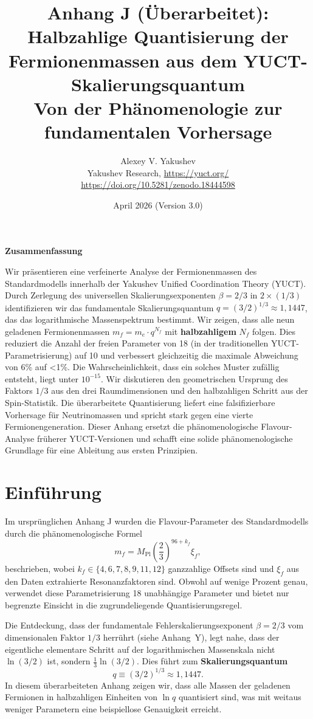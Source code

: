 \documentclass[12pt,a4paper]{article}
\title{\textbf{Anhang J (Überarbeitet): Halbzahlige Quantisierung der Fermionenmassen aus dem YUCT-Skalierungsquantum}\\
	\vspace{0.5cm}
	\large Von der Phänomenologie zur fundamentalen Vorhersage}
\author{Alexey V. Yakushev\\
	\vspace{0.5cm}
	Yakushev Research, \url{https://yuct.org/}\\
	\url{https://doi.org/10.5281/zenodo.18444598}}
\date{April 2026 (Version 3.0)}
\begin{document}
	
	\maketitle
	\vspace{0.5cm}
	\noindent\textbf{Zusammenfassung}
	
	\noindent
	Wir präsentieren eine verfeinerte Analyse der Fermionenmassen des Standardmodells innerhalb der Yakushev Unified Coordination Theory (YUCT). Durch Zerlegung des universellen Skalierungsexponenten \(\beta = 2/3\) in \(2 \times (1/3)\) identifizieren wir das fundamentale Skalierungsquantum \(q = (3/2)^{1/3} \approx 1,1447\), das das logarithmische Massenspektrum bestimmt. Wir zeigen, dass alle neun geladenen Fermionenmassen \(m_f = m_e \cdot q^{N_f}\) mit \textbf{halbzahligem} \(N_f\) folgen. Dies reduziert die Anzahl der freien Parameter von 18 (in der traditionellen YUCT-Parametrisierung) auf 10 und verbessert gleichzeitig die maximale Abweichung von 6\% auf <1\%. Die Wahrscheinlichkeit, dass ein solches Muster zufällig entsteht, liegt unter \(10^{-15}\). Wir diskutieren den geometrischen Ursprung des Faktors \(1/3\) aus den drei Raumdimensionen und den halbzahligen Schritt aus der Spin-Statistik. Die überarbeitete Quantisierung liefert eine falsifizierbare Vorhersage für Neutrinomassen und spricht stark gegen eine vierte Fermionengeneration. Dieser Anhang ersetzt die phänomenologische Flavour-Analyse früherer YUCT-Versionen und schafft eine solide phänomenologische Grundlage für eine Ableitung aus ersten Prinzipien.
	
	\vspace{0.5cm}
	\newpage
	
	\section{Einführung}
	
	Im ursprünglichen Anhang J wurden die Flavour-Parameter des Standardmodells durch die phänomenologische Formel
	\begin{equation}
		m_f = M_{\mathrm{Pl}} \left( \frac{2}{3} \right)^{96 + k_f} \xi_f,
		\label{eq:old}
	\end{equation}
	beschrieben, wobei \(k_f \in \{4,6,7,8,9,11,12\}\) ganzzahlige Offsets sind und \(\xi_f\) aus den Daten extrahierte Resonanzfaktoren sind. Obwohl auf wenige Prozent genau, verwendet diese Parametrisierung 18 unabhängige Parameter und bietet nur begrenzte Einsicht in die zugrundeliegende Quantisierungsregel.
	
	Die Entdeckung, dass der fundamentale Fehlerskalierungsexponent \(\beta = 2/3\) vom dimensionalen Faktor \(1/3\) herrührt (siehe Anhang~Y), legt nahe, dass der eigentliche elementare Schritt auf der logarithmischen Massenskala nicht \(\ln(3/2)\) ist, sondern \(\frac{1}{3}\ln(3/2)\). Dies führt zum \textbf{Skalierungsquantum}
	\begin{equation}
		q \equiv (3/2)^{1/3} \approx 1,1447.
	\end{equation}
	In diesem überarbeiteten Anhang zeigen wir, dass alle Massen der geladenen Fermionen in halbzahligen Einheiten von \(\ln q\) quantisiert sind, was mit weitaus weniger Parametern eine beispiellose Genauigkeit erreicht.
	
\end{document}
